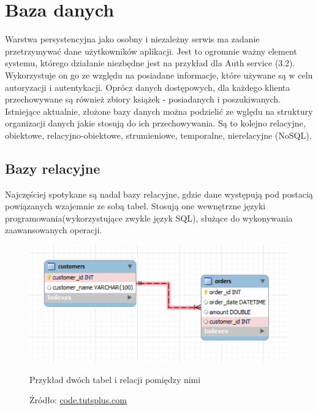 \section{Baza danych}
Warstwa persystencyjna jako osobny i niezależny serwis ma zadanie przetrzymywać dane użytkowników aplikacji. Jest to ogromnie ważny element systemu, którego działanie niezbędne jest na przykład dla Auth service (3.2). Wykorzystuje on go ze względu na posiadane informacje, które używane są w celu autoryzacji i autentykacji.
Oprócz danych dostępowych, dla każdego klienta przechowywane są również zbiory książek - posiadanych i poszukiwanych.\newline
Istniejące aktualnie, złożone bazy danych można podzielić ze wględu na struktury organizacji danych jakie stosują do ich przechowywania. Są to kolejno relacyjne, obiektowe, relacyjno-obiektowe, strumieniowe, temporalne, nierelacyjne (NoSQL).

\subsection{Bazy relacyjne}
Najczęściej spotykane są nadal bazy relacyjne, gdzie dane występują pod postacią powiązanych wzajemnie ze sobą tabel. Stosują one wewnętrzne języki programowania(wykorzystujące zwykle język SQL), służące do wykonywania zaawansowanych operacji.
\begin{figure}[H]
	\centering
	\includegraphics[width=\linewidth]{relations.pdf}
	\caption{\centering Przykład dwóch tabel i relacji pomiędzy nimi}
	\caption*{\centering Źródło: \url{code.tutsplus.com}}
\end{figure}

